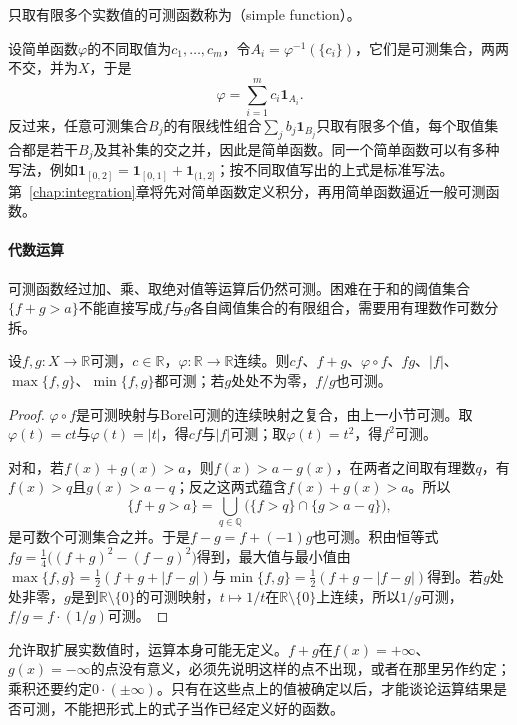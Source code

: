 \begin{definition}[简单函数]
\label{def:measure-simple-function}
只取有限多个实数值的可测函数称为（simple function）。
\end{definition}

设简单函数$\varphi$的不同取值为$c_1,\dots,c_m$，令$A_i=\varphi^{-1}(\{c_i\})$，它们是可测集合，两两不交，并为$X$，于是
\[
 \varphi=\sum_{i=1}^mc_i\mathbf 1_{A_i}.
\]
反过来，任意可测集合$B_j$的有限线性组合$\sum_jb_j\mathbf 1_{B_j}$只取有限多个值，每个取值集合都是若干$B_j$及其补集的交之并，因此是简单函数。同一个简单函数可以有多种写法，例如$\mathbf 1_{[0,2]}=\mathbf 1_{[0,1]}+\mathbf 1_{(1,2]}$；按不同取值写出的上式是标准写法。第~\ref{chap:integration}章将先对简单函数定义积分，再用简单函数逼近一般可测函数。

\paragraph{代数运算}
可测函数经过加、乘、取绝对值等运算后仍然可测。困难在于和的阈值集合$\{f+g>a\}$不能直接写成$f$与$g$各自阈值集合的有限组合，需要用有理数作可数分拆。

\begin{theorem}[可测函数的运算]
\label{thm:measure-function-operations}
设$f,g:X\to\mathbb R$可测，$c\in\mathbb R$，$\varphi:\mathbb R\to\mathbb R$连续。则$cf$、$f+g$、$\varphi\circ f$、$fg$、$|f|$、$\max\{f,g\}$、$\min\{f,g\}$都可测；若$g$处处不为零，$f/g$也可测。
\end{theorem}

\begin{proof}
$\varphi\circ f$是可测映射与Borel可测的连续映射之复合，由上一小节可测。取$\varphi(t)=ct$与$\varphi(t)=|t|$，得$cf$与$|f|$可测；取$\varphi(t)=t^2$，得$f^2$可测。

对和，若$f(x)+g(x)>a$，则$f(x)>a-g(x)$，在两者之间取有理数$q$，有$f(x)>q$且$g(x)>a-q$；反之这两式蕴含$f(x)+g(x)>a$。所以
\[
 \{f+g>a\}=\bigcup_{q\in\mathbb Q}\bigl(\{f>q\}\cap\{g>a-q\}\bigr),
\]
是可数个可测集合之并。于是$f-g=f+(-1)g$也可测。积由恒等式$fg=\tfrac14\bigl((f+g)^2-(f-g)^2\bigr)$得到，最大值与最小值由$\max\{f,g\}=\tfrac12(f+g+|f-g|)$与$\min\{f,g\}=\tfrac12(f+g-|f-g|)$得到。若$g$处处非零，$g$是到$\mathbb R\setminus\{0\}$的可测映射，$t\mapsto1/t$在$\mathbb R\setminus\{0\}$上连续，所以$1/g$可测，$f/g=f\cdot(1/g)$可测。
\end{proof}

允许取扩展实数值时，运算本身可能无定义。$f+g$在$f(x)=+\infty$、$g(x)=-\infty$的点没有意义，必须先说明这样的点不出现，或者在那里另作约定；乘积还要约定$0\cdot(\pm\infty)$。只有在这些点上的值被确定以后，才能谈论运算结果是否可测，不能把形式上的式子当作已经定义好的函数。

